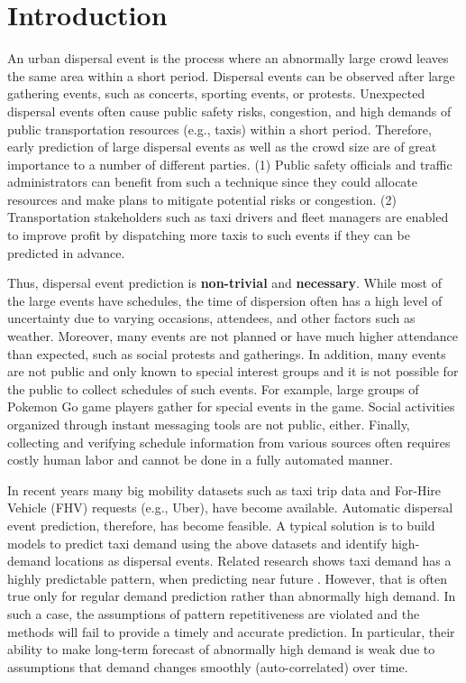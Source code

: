 \documentclass[letterpaper]{article} %
\begin{document}
\section{Introduction}
An urban dispersal event is the process where an abnormally large crowd leaves the same area within a short period. Dispersal events can be observed after large gathering events, such as concerts, sporting events, or protests. Unexpected dispersal events often cause public safety risks, congestion, and high demands of public transportation resources (e.g., taxis) within a short period. Therefore, early prediction of large dispersal events as well as the crowd size are of great importance to a number of different parties. (1) Public safety officials and traffic administrators can benefit from such a technique since they could allocate resources and make plans to mitigate potential risks or congestion. (2) Transportation stakeholders such as taxi drivers and fleet managers are enabled to improve profit by dispatching more taxis to such events if they can be predicted in advance.

Thus, dispersal event prediction is {\bf non-trivial} and {\bf necessary}. While most of the large events have schedules, the time of dispersion often has a high level of uncertainty due to varying occasions, attendees, and other factors such as weather. Moreover, many events are not planned or have much higher attendance than expected, such as social protests and gatherings. In addition, many events are not public and only known to special interest groups and it is not possible for the public to collect schedules of such events. For example, large groups of Pokemon Go game players gather for special events in the game. Social activities organized through instant messaging tools are not public, either. Finally, collecting and verifying schedule information from various sources often requires costly human labor and cannot be done in a fully automated manner.

In recent years many big mobility datasets such as taxi trip data and For-Hire Vehicle (FHV) requests (e.g., Uber), have become available. Automatic dispersal event prediction, therefore, has become feasible. A typical solution is to build models to predict taxi demand using the above datasets and identify high-demand locations as dispersal events. Related research shows taxi demand has a highly predictable pattern, when predicting near future \cite{zhao2016predicting,xu2017real,zhang2016framework,zhao2016predicting,moreira2013predicting,davis2016multi}. However, that is often true only for regular demand prediction rather than abnormally high demand. In such a case, the assumptions of pattern repetitiveness are violated and the methods will fail to provide a timely and accurate prediction. In particular, their ability to make long-term forecast of abnormally high demand is weak due to assumptions that demand changes smoothly (auto-correlated) over time.
\end{document}
